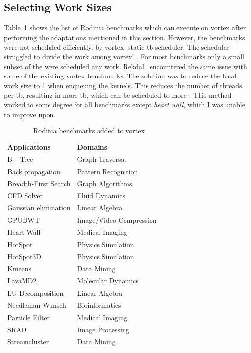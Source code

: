 \subsection{Selecting Work Sizes}

Table~\ref{tab:new_benchmarks} shows the list of Rodinia benchmarks which can execute on \Gls{vortex} after performing the adaptations mentioned in this section. However, the benchmarks were not scheduled efficiently, by \Gls{vortex}' static \acrshort{tb} scheduler. The scheduler struggled to divide the work among \Gls{vortex}' . For most benchmarks only a small subset of the  were scheduled any work. Rekdal~\cite{Rekdal_Master} encountered the same issue with some of the existing \Gls{vortex} benchmarks. The solution was to reduce the local work size to 1 when enqueuing the kernels. This reduces the number of threads per \acrshort{tb}, resulting in more \acrshort{tb}, which can be scheduled to more . This method worked to some degree for all benchmarks except \textit{heart wall}, which I was unable to improve upon.  

\begin{table}
    \centering
    \caption{Rodinia benchmarks added to \Gls{vortex}}
    \begin{tabular}{|l|l|l|l|} 
        \hline
        \textbf{Applications}      & \textbf{Domains} \\ \hhline{|=|=|}
        B+ Tree                    & Graph Traversal \\ \hline
        Back propagation           & Pattern Recognition \\ \hline
        Breadth-First Search       & Graph Algorithms  \\ \hline
        CFD Solver                 & Fluid Dynamics  \\ \hline
        Gaussian elimination       & Linear Algebra \\ \hline
        GPUDWT                     & Image/Video Compression  \\ \hline
        Heart Wall                 & Medical Imaging \\ \hline
        HotSpot                    & Physics Simulation  \\ \hline
        HotSpot3D                  & Physics Simulation  \\ \hline
        Kmeans                     & Data Mining \\ \hline
        LavaMD2                    & Molecular Dynamics\\ \hline
        LU Decomposition           & Linear Algebra  \\ \hline
        Needleman-Wunsch           & Bioinformatics\\ \hline
        Particle Filter            & Medical Imaging \\ \hline
        SRAD                       & Image Processing  \\ \hline
        Streamcluster              & Data Mining \\ \hline
    \end{tabular}
    \label{tab:new_benchmarks}
\end{table}

